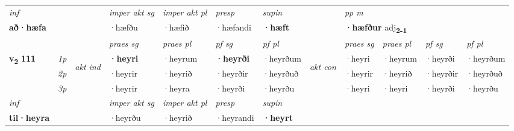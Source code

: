 \begin{longtable}[l]{X>{\footnotesize\itshape}llXXXXlXXXX}
   {\textit{inf}} & &  & \textit{imper akt sg} & \textit{imper akt pl}   & \textit{presp} & \textit{supin}  && \textit{pp m} \\*
  {\textbf{að\allowbreak ·hæfa}} & && ·hæfðu  & ·hæfið   & ·hæfandi &  \textbf{·hæft}  && \multicolumn{2}{l}{\textbf{·hæfður} adj\textbf{\textsubscript{2-1}}} \\*

\midrule

 & &   & \textit{praes sg}  & \textit{praes pl}    & \textit{ pf sg} & \textit{pf pl} & & \textit{praes sg}  & \textit{praes pl}    & \textit{pf sg} & \textit{pf pl }  \\ \cmidrule{4-7} \cmidrule{9-12}
 \multirow{2}{*}{{{\textbf{v{\textsubscript{2}}} \Large{\textbf{111}}}}}  & 1p & \multirow{3}{*}{\begin{turn}{90}\textit{akt ind}\end{turn}} & \textbf{·heyri} & ·heyrum & \textbf{·heyrði} & ·heyrðum & \multirow{3}{*}{\begin{turn}{90}\textit{akt con}\end{turn}} &·heyri & ·heyrum & ·heyrði & ·heyrðum\\*
 & 2p &  &  ·heyrir  & ·heyrið & ·heyrðir & ·heyrðuð & & ·heyrir & ·heyrið & ·heyrðir & ·heyrðuð \\*
 & 3p &  & ·heyrir & ·heyra & ·heyrði & ·heyrðu & & ·heyri & ·heyri& ·heyrði & ·heyrðu \\*
\cmidrule{4-7} \cmidrule{9-12}

   {\textit{inf}} & &  & \textit{imper akt sg} & \textit{imper akt pl}   & \textit{presp} & \textit{supin}   \\*
  {\textbf{til\allowbreak ·heyra}} & && ·heyrðu  & ·heyrið   & ·heyrandi &  \textbf{·heyrt}   \\*

\midrule


\end{longtable}
